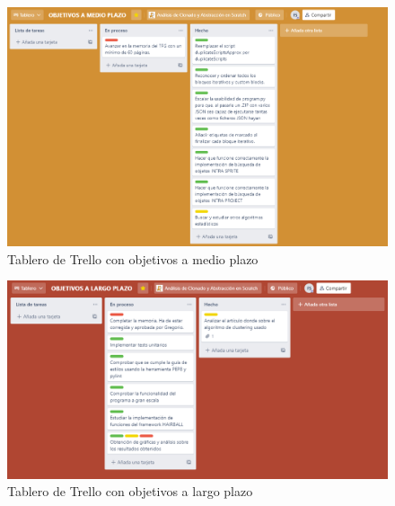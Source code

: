 \documentclass[a4paper, 12pt]{book}
\begin{document}
 \begin{figure}[htb!]
  	 \centering
    \includegraphics[width=17cm, keepaspectratio]{img/obj_medioplazo.png}
    \caption{Tablero de Trello con objetivos a medio plazo}
    \label{fig:trello_medio}
 \end{figure}
 
  \begin{figure}[htb!]
  	 \centering
    \includegraphics[width=17cm, keepaspectratio]{img/obj_largoplazo.png}
    \caption{Tablero de Trello con objetivos a largo plazo}
    \label{fig:trello_largo}
 \end{figure}
 
\end{document}
